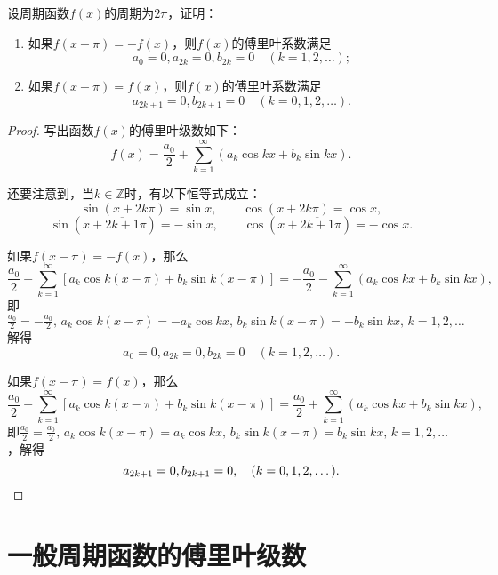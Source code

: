 \begin{example}
设周期函数\(f(x)\)的周期为\(2\pi\)，证明：\begin{enumerate}
\item 如果\(f(x-\pi) = -f(x)\)，则\(f(x)\)的傅里叶系数满足\[
a_0 = 0,
a_{2k} = 0,
b_{2k} = 0
\quad(k=1,2,\dotsc);
\]
\item 如果\(f(x-\pi) = f(x)\)，则\(f(x)\)的傅里叶系数满足\[
a_{2k+1} = 0,
b_{2k+1} = 0
\quad(k=0,1,2,\dotsc).
\]
\end{enumerate}
\begin{proof}
写出函数\(f(x)\)的傅里叶级数如下：\[
f(x) = \frac{a_0}{2} + \sum\limits_{k=1}^{\infty} \left(
a_k \cos kx
+ b_k \sin kx
\right).
\]

还要注意到，当\(k\in\mathbb{Z}\)时，有以下恒等式成立：\[
\sin(x+2k\pi) = \sin x, \qquad
\cos(x+2k\pi) = \cos x,
\]\[
\sin(x+\overline{2k+1}\pi) = -\sin x, \qquad
\cos(x+\overline{2k+1}\pi) = -\cos x.
\]

如果\(f(x-\pi) = -f(x)\)，那么\[
\frac{a_0}{2} + \sum\limits_{k=1}^{\infty} \left[
a_k \cos k(x-\pi)
+ b_k \sin k(x-\pi)
\right]
=
-\frac{a_0}{2} - \sum\limits_{k=1}^{\infty} \left(
a_k \cos kx
+ b_k \sin kx
\right),
\]即\(
\frac{a_0}{2} = -\frac{a_0}{2}, \,
a_k \cos k(x-\pi) = - a_k \cos kx, \,
b_k \sin k(x-\pi) = - b_k \sin kx, \,
k=1,2,\dotsc
\)解得\[
a_0 = 0,
a_{2k} = 0,
b_{2k} = 0
\quad(k=1,2,\dotsc).
\]

如果\(f(x-\pi) = f(x)\)，那么\[
\frac{a_0}{2} + \sum\limits_{k=1}^{\infty} \left[
a_k \cos k(x-\pi)
+ b_k \sin k(x-\pi)
\right]
=
\frac{a_0}{2} + \sum\limits_{k=1}^{\infty} \left(
a_k \cos kx
+ b_k \sin kx
\right),
\]即\(
\frac{a_0}{2} = \frac{a_0}{2}, \,
a_k \cos k(x-\pi) = a_k \cos kx, \,
b_k \sin k(x-\pi) = b_k \sin kx, \,
k=1,2,\dotsc
\)，解得\[
a_{2k+1} = 0,
b_{2k+1} = 0,
\quad(k=0,1,2,\dotsc).
\qedhere
\]
\end{proof}
\end{example}


\section{一般周期函数的傅里叶级数}
